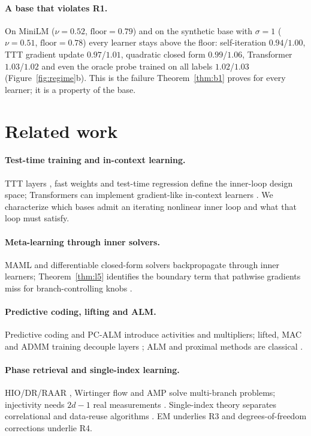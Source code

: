 \documentclass{article}
\theoremstyle{definition}
\theoremstyle{remark}
\newcommand{\flr}{\mathrm{floor}}
\begin{document}
\paragraph{A base that violates R1.}
On MiniLM ($\nu=0.52$, $\flr=0.79$) and on the synthetic base with $\sigma=1$ ($\nu=0.51$, $\flr=0.78$) every learner stays above the floor: self-iteration $0.94$/$1.00$, TTT gradient update $0.97$/$1.01$, quadratic closed form $0.99$/$1.06$, Transformer $1.03$/$1.02$ and even the oracle probe trained on all labels $1.02$/$1.03$ (Figure~\ref{fig:regime}b).
This is the failure Theorem~\ref{thm:b1} proves for every learner; it is a property of the base.

\section{Related work}

\paragraph{Test-time training and in-context learning.}
TTT layers \citep{sun2023ttt,sun2024ttt}, fast weights \citep{schlag2021fastweights} and test-time regression \citep{wang2026ttr} define the inner-loop design space; Transformers can implement gradient-like in-context learners \citep{garg2022icl,vonoswald2023icl}. We characterize which bases admit an iterating nonlinear inner loop and what that loop must satisfy.
\paragraph{Meta-learning through inner solvers.}
MAML \citep{finn2017maml} and differentiable closed-form solvers \citep{bertinetto2019r2d2} backpropagate through inner learners; Theorem~\ref{thm:l5} identifies the boundary term that pathwise gradients miss for branch-controlling knobs \citep[cf.][]{mohamed2020mcgrad}.
\paragraph{Predictive coding, lifting and ALM.}
Predictive coding \citep{whittington2017predictive} and PC-ALM \citep{seely2026pcalm} introduce activities and multipliers; lifted, MAC and ADMM training decouple layers \citep{carreira2014mac,taylor2016admm,askari2018lifted}; ALM and proximal methods are classical \citep{hestenes1969multiplier,rockafellar1976augmented}.
\paragraph{Phase retrieval and single-index learning.}
HIO/DR/RAAR \citep{fienup1982phase,bauschke2002phase}, Wirtinger flow \citep{candes2015wf} and AMP \citep{rangan2011gamp} solve multi-branch problems; injectivity needs $2d-1$ real measurements \citep{balan2006phase}. Single-index theory separates correlational and data-reuse algorithms \citep{benarous2021online,damian2023smoothing,dandi2024reuse,lee2024neural}. EM \citep{dempster1977em} underlies R3 and degrees-of-freedom corrections \citep{craven1979gcv} underlie R4.
\end{document}
